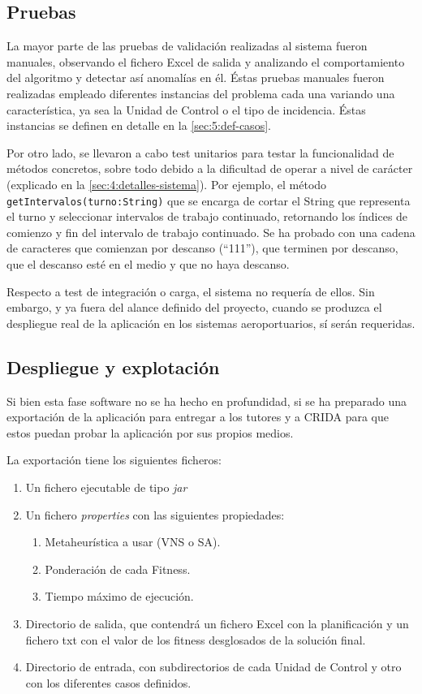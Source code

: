 \subsection{Pruebas}
\label{sec:4:tests}

La mayor parte de las pruebas de validación realizadas al sistema fueron manuales, observando el fichero Excel de salida y analizando el comportamiento del algoritmo y detectar así anomalías en él. Éstas pruebas manuales fueron realizadas empleado diferentes instancias del problema cada una variando una característica, ya sea la Unidad de Control o el tipo de incidencia. Éstas instancias se definen en detalle en la \autoref{sec:5:def-casos}.

Por otro lado, se llevaron a cabo test unitarios para testar la funcionalidad de métodos concretos, sobre todo debido a la dificultad de operar a nivel de carácter (explicado en la \autoref{sec:4:detalles-sistema}).
Por ejemplo, el método \texttt{getIntervalos(turno:String)} que se encarga de cortar el String que representa el turno y seleccionar intervalos de trabajo continuado, retornando los índices de comienzo y fin del intervalo de trabajo continuado. Se ha probado con una cadena de caracteres que comienzan por descanso (``111''), que terminen por descanso, que el descanso esté en el medio y que no haya descanso.

Respecto a test de integración o carga, el sistema no requería de ellos. Sin embargo, y ya fuera del alance definido del proyecto, cuando se produzca el despliegue real de la aplicación en los sistemas aeroportuarios, sí serán requeridas.

\subsection{Despliegue y explotación} 
\label{sec:4:despliegue}

Si bien esta fase software no se ha hecho en profundidad, si se ha preparado una exportación de la aplicación para entregar a los tutores y a \gls{CRIDA} para que estos puedan probar la aplicación por sus propios medios.

La exportación tiene los siguientes ficheros:
\begin{enumerate}
	\item Un fichero ejecutable de tipo \textit{jar}
	\item Un fichero \textit{properties} con las siguientes propiedades:
	\begin{enumerate}[label*={\arabic*}]
		\item Metaheurística a usar (VNS o SA).
		\item Ponderación de cada Fitness.
		\item Tiempo máximo de ejecución.
	\end{enumerate}
	\item Directorio de salida, que contendrá un fichero Excel con la planificación y un fichero txt con el valor de  los fitness desglosados de la solución final.
	\item Directorio de entrada, con subdirectorios de cada Unidad de Control y otro con los diferentes casos definidos.
\end{enumerate}

